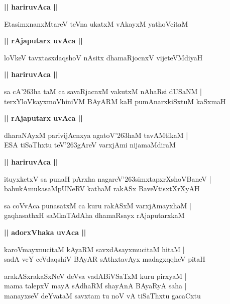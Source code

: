 \documentclass[twoside,12pt,openright]{book}
\def\S{\char'263}
\newcounter{shloka}[chapter]
\def\uvaca#1{\centerline{{\large\textbf{#1}}}}
\begin{document}
\uvaca{|| hariruvAca ||}

\begin{shloka}%
EtasimxnanxMtareV teVna ukatxM vAkayxM yathoVcitaM 
\end{shloka}

\uvaca{|| rAjaputarx uvAca ||}

\begin{shloka}%
loVkeV tavxtasxdaqshoV nAsitx dhamaRjocnxV vijeteVMdiyaH 
\end{shloka}

\uvaca{|| hariruvAca ||}

\begin{shloka}%
sa cA\S ha taM ca savaRjacnxM vakutxM nAhaRsi dUSaNM |\\
terxYloVkayxmoVhiniVM BAyARM kaH pumAnarxkiSxtuM kaSxmaH
\end{shloka}

\uvaca{|| rAjaputarx uvAca ||}

\begin{shloka}%
dharaNAyxM parivijAcnxya agatoV\S haM tavAMtikaM |\\
ESA tiSaThxtu teV\S gAreV varxjAmi nijamaMdiraM 
\end{shloka}

\uvaca{|| hariruvAca ||}

\begin{shloka}%
ituyxketxV sa punaH pArxha nagareV\S simxtapxrXshoVBaneV |\\
bahukAmukasaMpUNeRV kathaM rakASx BaveVtisxtXrXyAH 
\end{shloka}

\begin{shloka}%
sa coVvAca punasatxM ca kuru rakASxM varxjAmayxhaM |\\
gaqhasathxH saMkaTAdAha dhamaRsayx rAjaputarxkaM 
\end{shloka}

\uvaca{|| adorxVhaka uvAca ||}

\begin{shloka}%
karoVmayxnucitaM kAyaRM savxdAsayxmucitaM hitaM |\\
sadA veY ceVdaqshiV BAyAR sAthxtavAyx madagxqqheV pitaH 
\end{shloka}

\begin{shloka}%
arakASxrakaSxNeV deVva vadABiVSaTxM kuru pirxyaM |\\
mama talepxV mayA sAdhaRM shayAnA BAyaRyA saha |\\
manayxseV deYvataM savxtam tu noV vA tiSaThxtu gacaCxtu
\end{shloka}
\end{document}
